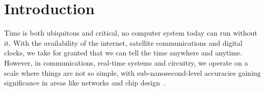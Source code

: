 
\section{Introduction}


Time is both ubiquitous and critical, no computer system today can run without it. With the availability of the internet, satellite communications and digital clocks, we take for granted that we can tell the time anywhere and anytime.
%
However, in communications, real-time systems and circuitry, we operate on a scale where things are not so simple, with sub-nanosecond-level accuracies gaining significance in areas like networks and chip design~\cite{nanopu,sub-nanosecond-comms-design}.

